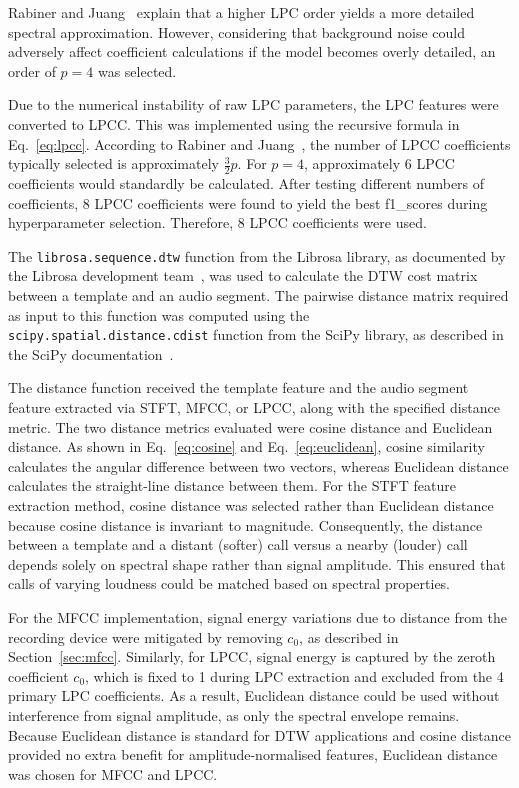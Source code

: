 Rabiner and Juang~\cite{lpc} explain that a higher \acs{LPC} order yields a more detailed spectral approximation. However, considering that background noise could adversely affect coefficient calculations 
if the model becomes overly detailed, an order of $p = 4$ was selected.

Due to the numerical instability of raw \acs{LPC} parameters, the \acs{LPC} features were converted to \ac{LPCC}. This was implemented using the recursive formula 
in Eq.~\eqref{eq:lpcc}. According to Rabiner and Juang~\cite{lpc}, the number of \acs{LPCC} coefficients typically selected is approximately $\frac{3}{2}p$. For $p = 4$, approximately 6 \acs{LPCC} 
coefficients would standardly be calculated. After testing different numbers of coefficients, 8 \acs{LPCC} coefficients were found to yield the best \gls{f1_score}s 
during hyperparameter selection. Therefore, 8 \acs{LPCC} coefficients were used.


\label{sec:dtw_method}
The \texttt{librosa.sequence.dtw} function from the Librosa library, as documented by the Librosa development team~\cite{librosa_dtw}, was used to calculate the \ac{DTW} cost matrix between a template and an audio segment. The 
pairwise distance matrix required as input to this function was computed using the \texttt{scipy.spatial.distance.cdist} function from the SciPy library, 
as described in the SciPy documentation~\cite{scipy_dist}. 

The distance function received the template feature and the audio segment feature extracted via \acs{STFT}, \acs{MFCC}, or \acs{LPCC}, along with the specified 
distance metric. The two distance metrics evaluated were cosine distance and Euclidean distance. As shown in Eq.~\eqref{eq:cosine} and Eq.~\eqref{eq:euclidean}, 
cosine similarity calculates the angular difference between two vectors, whereas Euclidean distance calculates the straight-line distance between them. For the 
\acs{STFT} feature extraction method, cosine distance was selected rather than Euclidean distance because cosine distance is invariant to magnitude. Consequently, 
the distance between a template and a distant (softer) call versus a nearby (louder) call depends solely on spectral shape rather than signal amplitude. This 
ensured that calls of varying loudness could be matched based on spectral properties. 

For the \acs{MFCC} implementation, signal energy variations due to distance from the recording device were mitigated by removing $c_0$, as described in 
Section~\ref{sec:mfcc}. Similarly, for \acs{LPCC}, signal energy is captured by the zeroth coefficient $c_0$, which is fixed to 1 during \acs{LPC} extraction 
and excluded from the 4 primary \acs{LPC} coefficients. As a result, Euclidean distance could be used without interference from signal amplitude, as only the 
spectral envelope remains. Because Euclidean distance is standard for \ac{DTW} applications and cosine distance provided no extra benefit for amplitude-normalised 
features, Euclidean distance was chosen for \acs{MFCC} and \acs{LPCC}.

